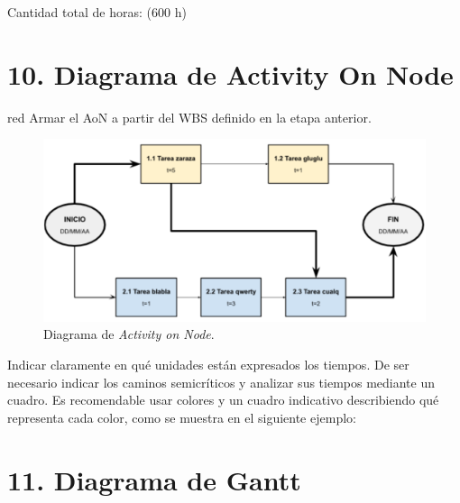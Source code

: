 \documentclass[
11pt, %
codirector, %
]{charter}
\begin{document}
Cantidad total de horas: (600 h)

\section{10. Diagrama de Activity On Node}
\label{sec:AoN}

\begin{consigna}{red}
Armar el AoN a partir del WBS definido en la etapa anterior. 



\end{consigna}

\begin{figure}[htpb]
\centering 
\includegraphics[width=.8\textwidth]{./Figuras/AoN.png}
\caption{Diagrama de \textit{Activity on Node}.}
\label{fig:AoN}
\end{figure}

Indicar claramente en qué unidades están expresados los tiempos.
De ser necesario indicar los caminos semicríticos y analizar sus tiempos mediante un cuadro.
Es recomendable usar colores y un cuadro indicativo describiendo qué representa cada color, como se muestra en el siguiente ejemplo:



\section{11. Diagrama de Gantt}
\label{sec:gantt}
\end{document}
